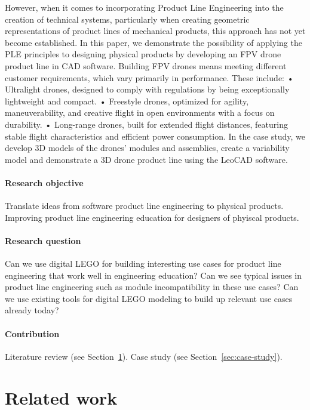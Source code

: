 \documentclass[sigconf,review]{acmart}
\begin{document}
However, when it comes to incorporating Product Line Engineering into the creation of technical systems, particularly when creating geometric representations of product lines of mechanical products, this approach has not yet become established. 
In this paper, we demonstrate the possibility of applying the PLE principles to designing physical products by developing an FPV drone product line in CAD software. Building FPV drones means meeting different customer requirements, which vary primarily in performance. These include:     
•	Ultralight drones, designed to comply with regulations by being exceptionally lightweight and compact.
•	Freestyle drones, optimized for agility, maneuverability, and creative flight in open environments with a focus on durability. 
•	Long-range drones, built for extended flight distances, featuring stable flight characteristics and efficient power consumption.
In the case study, we develop 3D models of the drones’ modules and assemblies, create a variability model and demonstrate a 3D drone product line using the LeoCAD software.


\paragraph{Research objective}

Translate ideas from software product line engineering to physical products.
Improving product line engineering education for designers of phyiscal products.

\paragraph{Research question}

Can we use digital LEGO for building interesting use cases for product line engineering that work well in engineering education?
Can we see typical issues in product line engineering such as module incompatibility in these use cases?
Can we use existing tools for digital LEGO modeling to build up relevant use cases already today?

\paragraph{Contribution}

Literature review (see Section~\ref{sec:related-work}). Case study (see Section~\ref{sec:case-study}).

\section{Related work}
\label{sec:related-work}
\end{document}
